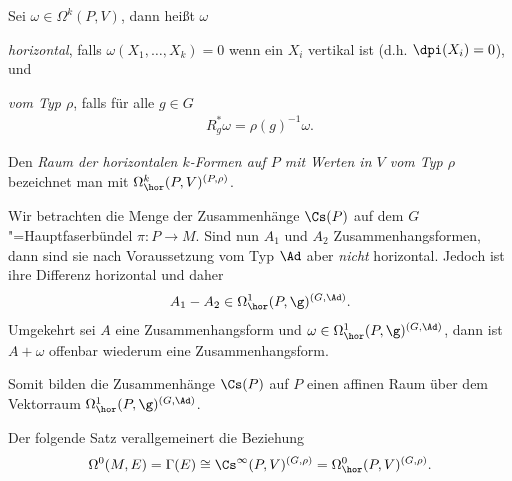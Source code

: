 \documentclass[%
	paper=a5,%
	fleqn,%
	DIV=18,%
	BCOR=0mm,
	fontsize=11pt,
	titlepage=false,%
	bibliography=totoc,
	DIV=18,%
	twoside=true,
	pdftitle=Riemannsche Geometrie,
	pdfauthor=Uwe Semmelmann,
	numbers=noendperiod]%
	{scrbook}
\begin{document}
\begin{defn}
Sei $\omega\in \Omega^k(P,V)$, dann heißt $\omega$
\begin{defnenum}
\item \emph{horizontal}, falls $\omega(X_1,\ldots,X_k) = 0$ wenn ein $X_i$
vertikal ist (d.h. $\dpi(X_i) = 0$), und
\item \emph{vom Typ $\rho$}, falls für alle $g\in G$
\begin{align*}
R_g^* \omega = \rho(g)^{-1}\omega.
\end{align*}
\end{defnenum}
Den \emph{Raum der horizontalen $k$-Formen auf $P$ mit Werten in $V$ vom Typ
$\rho$} bezeichnet man mit $\Omega^k_\hor(P,V)^{(P,\rho)}$.\fish
\end{defn}

\begin{ex}
Wir betrachten die Menge der Zusammenhänge $\Cs(P)$ auf dem
$G$"=Hauptfaserbündel $\pi\colon P\to M$. Sind nun $A_1$ und $A_2$
Zusammenhangsformen, dann sind sie nach Voraussetzung vom Typ $\Ad$ aber
\textit{nicht} horizontal. Jedoch ist ihre Differenz horizontal und daher
\begin{align*}
A_1-A_2 \in \Omega^1_\hor(P,\g)^{(G,\Ad)}.
\end{align*}
Umgekehrt sei $A$ eine Zusammenhangsform und
$\omega\in\Omega_\hor^1(P,\g)^{(G,\Ad)}$, dann ist $A+\omega$ offenbar wiederum
eine Zusammenhangsform.

Somit bilden die Zusammenhänge $\Cs(P)$ auf $P$ einen affinen Raum über dem
Vektorraum $\Omega_\hor^1(P,\g)^{(G,\Ad)}$.\boxc
\end{ex}

Der folgende Satz verallgemeinert die Beziehung
\begin{align*}
\Omega^0(M,E) = \Gamma(E)\cong \Cs^\infty(P,V)^{(G,\rho)} = \Omega_\hor^0(P,V)^{(G,\rho)}.
\end{align*}
\end{document}
